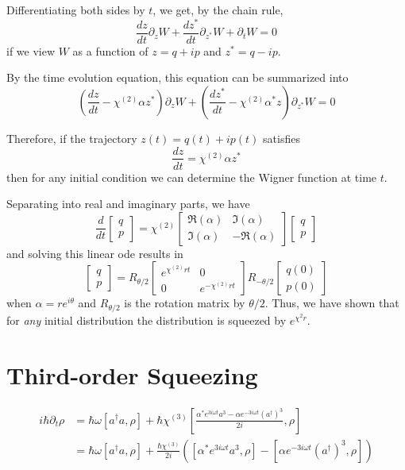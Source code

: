 \documentclass{article}
\begin{document}
Differentiating both sides by $t$, we get, by the chain rule,
\[\frac{dz}{dt}\partial_{z}W+\frac{dz^{*}}{dt}\partial_{z^{*}}W+\partial_{t}W=0\]
if we view $W$ as a function of $z=q+ip$ and $z^{*}=q-ip$.

By the time evolution equation, this equation can be summarized into
\[\left(\frac{dz}{dt}-\chi^{(2)}\alpha z^{*}\right)\partial_{z}W+\left(\frac{dz^{*}}{dt}-\chi^{(2)}\alpha^{*} z\right)\partial_{z^{*}}W=0\]

Therefore, if the trajectory $z(t)=q(t)+ip(t)$ satisfies
\[\frac{dz}{dt}=\chi^{(2)}\alpha z^{*}\]
then for any initial condition we can determine the Wigner function at time $t$.

Separating into real and imaginary parts, we have
\[
  \frac{d}{dt}
  \begin{bmatrix}
    q \\
    p
  \end{bmatrix}
  = \chi^{(2)}
  \begin{bmatrix}
    \Re(\alpha) & \Im(\alpha)  \\
    \Im(\alpha) & -\Re(\alpha)
  \end{bmatrix}
  \begin{bmatrix}
    q \\
    p
  \end{bmatrix}
\]
and solving this linear ode results in
\[
  \begin{bmatrix}
    q \\
    p
  \end{bmatrix}
  =
  R_{\theta/2}
  \begin{bmatrix}
    e^{\chi^{(2)}rt} & 0                 \\
    0                & e^{-\chi^{(2)}rt}
  \end{bmatrix}
  R_{-\theta/2}
  \begin{bmatrix}
    q(0) \\
    p(0)
  \end{bmatrix}
\]
when $\alpha=re^{i\theta}$ and $R_{\theta/2}$ is the rotation matrix by $\theta/2$.
Thus, we have shown that for \textit{any} initial distribution the distribution is squeezed by
$e^{\chi^{2}r}$.
\section{Third-order Squeezing}
\begin{align*}
  i\hbar\partial_{t}\rho & = \hbar\omega[a^{\dag}a, \rho]+\hbar\chi^{(3)}\left[\frac{\alpha^{*}e^{3i\omega t}a^{3}-\alpha e^{-3i\omega t}(a^{\dag})^{3}}{2i}, \rho\right] \\
                         & = \hbar\omega[a^{\dag}a, \rho]+\frac{\hbar\chi^{(3)}}{2i}([\alpha^{*}e^{3i\omega t}a^{3}, \rho]-[\alpha e^{-3i\omega t}(a^{\dag})^{3}, \rho])
\end{align*}
\end{document}
